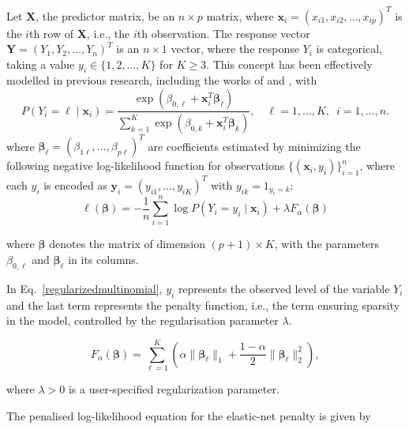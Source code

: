 Let \(\mathbf{ X} \), the predictor matrix, be an \( n \times p \) matrix,  where \( \mathbf{x}_i = ( x_{i1}, x_{i2}, \dots, x_{ip} )^T \)
is the \( i \)th row of \( \mathbf{ X} \), i.e., the \( i \)th observation. The response vector \( \mathbf{Y} = ( Y_1, Y_2, \dots, Y_n )^T \) is an
\( n \times 1 \) vector, where the response \( Y_i \) is categorical, taking a value \( y_i \in \{1, 2, \dots, K\} \) for \( K \geq 3 \).
This concept has been effectively modelled in previous research, including the works of \citep{zhu2004classification} and \citep{friedman2010regularization}, with
\begin{equation}
P(Y_i = \ell \mid \mathbf{x}_i) = \frac{\exp \left(\beta_{0,\ell} + \mathbf{x}_i^T \boldsymbol{\beta}_{ \ell} \right)}{\sum_{k=1}^{K} 
\exp \left(\beta_{0,k} + \mathbf{x}_i^T\boldsymbol{\beta}_{k}\right)}, \quad \ell = 1, \dots, K,\,\,\,i=1,\ldots, n.
\end{equation}
where $\boldsymbol{\beta}_{\ell} = (\beta_{1\ell}, . . . , \beta_{p\ell})^T$ are coefficients estimated by minimizing the following negative log-likelihood function
for observations \( \{ (\mathbf{x}_i, y_i) \}_{i=1}^{n} \), where each \( y_i \) is encoded as \( \mathbf{y}_i = (y_{i1}, \dots, y_{iK})^T \) with \( y_{ik} = 1_{y_i = k} \):
\begin{equation}\label{regularizedmultinomial}
\ell(\boldsymbol{\beta}) = -\frac{1}{n} \sum_{i=1}^{n} \log P(Y_i = y_i \mid \mathbf{x}_i) + \lambda F_{\alpha}(\boldsymbol{\beta})
\end{equation}

\noindent where $\boldsymbol{\beta}$ denotes the matrix of dimension $(p + 1) \times K$, with the parameters $\beta_{0,\ell}$ and
$\boldsymbol{\beta}_{\ell}$ in its columns.

In Eq.~\eqref{regularizedmultinomial}, $y_{i}$ represents the observed level of the variable $Y_i$ and the last
term represents the penalty function, i.e., the term ensuring sparsity in the model, controlled by the regularisation parameter $\lambda$. 

\begin{equation}\label{eq:elastic_net_regularization}
F_{\alpha}(\boldsymbol{\beta}) = \sum_{\ell=1}^{K} \left( \alpha \|\boldsymbol{\beta}_{\ell}\|_1 + \frac{1 - \alpha}{2} \|\boldsymbol{\beta}_{\ell}\|_2^2 \right),
\end{equation}

where \( \lambda > 0 \) is a user-specified regularization parameter.

The penalised log-likelihood equation for the elastic-net penalty \citep{friedman2023glmnet} is given by
\small %

